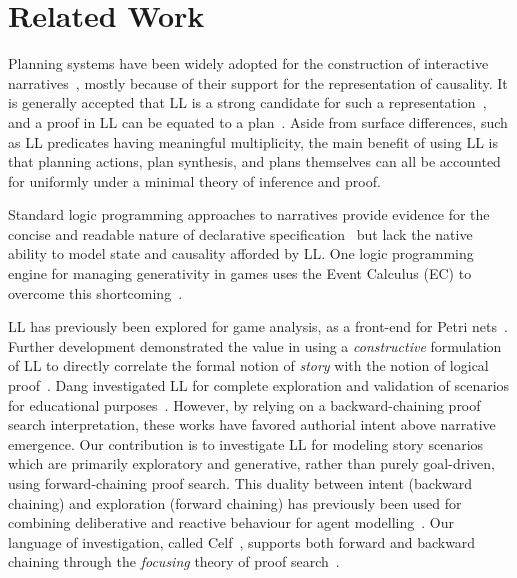 \documentclass[letterpaper]{article}
\begin{document}
\section{Related Work}

Planning systems have been widely adopted for the construction of
interactive narratives~\cite{Young99,Porteous10}, mostly because of their
support for the representation of causality. It is generally accepted that
LL is a strong candidate for such a representation~\cite{GirardILL87}, and
a proof in LL can be equated to a plan~\cite{Masseron93a,Masseron93b}.
Aside from surface differences, such as LL predicates having
meaningful multiplicity, the main benefit of using LL is that
planning actions, plan synthesis, and plans themselves can all be accounted
for uniformly under a minimal theory of inference and proof. 


Standard logic programming approaches to narratives provide evidence for
the concise and readable nature of declarative
specification~\cite{Grasbon01,Lang99} but lack the native ability to model
state and causality afforded by LL. One logic programming engine for
managing generativity in games uses the Event Calculus (EC) to overcome this
shortcoming~\cite{Smith11}.


LL has previously been explored for game analysis, as a front-end for Petri
nets~\cite{Colle2005}.  Further development demonstrated the value in using
a {\em constructive} formulation of LL to directly correlate the formal
notion of {\em story} with the notion of logical
proof~\cite{Bosser10,Bosser11}. Dang investigated LL for complete
exploration and validation of scenarios for educational
purposes~\cite{DangCA13}.  However, by relying on a backward-chaining proof
search interpretation, these works have favored authorial intent above
narrative emergence. Our contribution is to investigate LL for modeling
story scenarios which are primarily exploratory and generative, rather than
purely goal-driven, using forward-chaining proof search.
This duality between intent (backward chaining) and exploration
(forward chaining) has previously been used for combining deliberative and
reactive behaviour for agent modelling~\cite{Harland04}. Our language of
investigation, called Celf~\cite{schacknielsen08celf}, supports both
forward and backward chaining through the {\em focusing} theory of
proof search~\cite{chaudhuri10logical}.
\end{document}
